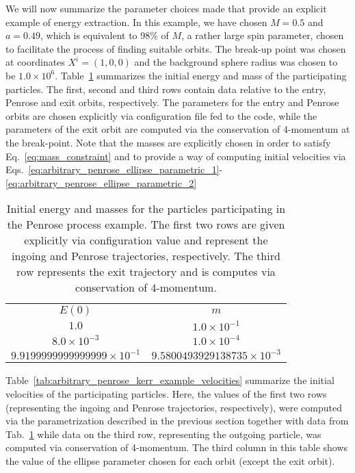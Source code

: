 We will now summarize the parameter choices made that provide an explicit example of energy extraction. In this example, we have chosen $M = 0.5$ and $a = 0.49$, which is equivalent to 98\% of $M$, a rather large spin parameter, chosen to facilitate the process of finding suitable orbits. The break-up point was chosen at coordinates $X^i = (1, 0, 0)$ and the background sphere radius was chosen to be $1.0\times 10^6$. Table~\ref{tab:arbitrary_penrose_kerr_example_energy_mass} summarizes the initial energy and mass of the participating particles. The first, second and third rows contain data relative to the entry, Penrose and exit orbits, respectively. The parameters for the entry and Penrose orbits are chosen explicitly via configuration file fed to the code, while the parameters of the exit orbit are computed via the conservation of 4-momentum at the break-point. Note that the masses are explicitly chosen in order to satisfy Eq.~\eqref{eq:mass_constraint} and to provide a way of computing initial velocities via Eqs.~\eqref{eq:arbitrary_penrose_ellipse_parametric_1}-\eqref{eq:arbitrary_penrose_ellipse_parametric_2}

\begin{table}[]
  \centering
  \begin{tabular}{cc}
    \hline\hline
    $E(0)$                              & $m$                                 \\
    $1.0$                               & $1.0 \times 10^{-1}$                \\
    $8.0 \times 10^{-3}$                & $1.0 \times 10^{-4}$                \\
    $9.9199999999999999 \times 10^{-1}$ & $9.5800493929138735 \times 10^{-3}$ \\ \hline\hline
  \end{tabular}
  \caption{Initial energy and masses for the particles participating in the Penrose process example. The first two rows are given explicitly via configuration value and represent the ingoing and Penrose trajectories, respectively. The third row represents the exit trajectory and is computes via conservation of 4-momentum.}
  \label{tab:arbitrary_penrose_kerr_example_energy_mass}
\end{table}

Table~\ref{tab:arbitrary_penrose_kerr_example_velocities} summarize the initial velocities of the participating particles. Here, the values of the first two rows (representing the ingoing and Penrose trajectories, respectively), were computed via the parametrization described in the previous section together with data from Tab.~\ref{tab:arbitrary_penrose_kerr_example_energy_mass} while data on the third row, representing the outgoing particle, was computed via conservation of 4-momentum. The third column in this table shows the value of the ellipse parameter chosen for each orbit (except the exit orbit).

